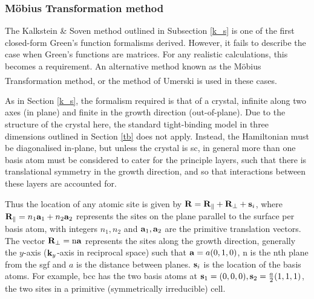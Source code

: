 \documentclass[a4paper, 12pt]{article}
\begin{document}
	\subsubsection{M\"{o}bius Transformation method}
	The Kalkstein \& Soven method outlined in Subsection \ref{k_s} is one of the first closed-form Green's function formalisms derived. However, it fails to describe the case when Green's functions are matrices. For any realistic calculations, this becomes a requirement. 
An alternative method known as the M\"{o}bius Transformation method, or the method of Umerski\textcolor{blue}{\textsuperscript{\cite{AU_SGF}}} is used in these cases.
\\\par As in Section \ref{k_s}, the formalism required is that of a crystal, infinite along two axes (in plane) and finite in the growth direction (out-of-plane). Due to the structure of the crystal here, the standard tight-binding model in three dimensions outlined in Section \ref{tb} does not apply.
Instead, the Hamiltonian must be diagonalised in-plane, but unless the crystal is \gls{sc}, in general more than one basis atom must be considered to cater for the principle layers, such that there is translational symmetry in the growth direction, and so that interactions between these layers are accounted for.
\\\par Thus the location of any atomic site is given by ${\bf R} = {\bf R}_\parallel + {\bf R}_\perp +{\bf s}_i$, where ${\bf R}_\parallel = n_1{\bf a}_1+n_2{\bf a}_2$ represents the sites on the plane parallel to the surface per basis atom, with integers $n_1,n_2$ and ${\bf a}_1,{\bf a}_2$ are the primitive translation vectors. The vector ${\bf R}_\perp = \rm n\bf a$ represents the sites along the growth direction, generally the $y$-axis (${\bf k}_y$-axis in reciprocal space) such that ${\bf a} = a(0,1,0)$, n is the nth plane from the \gls{sgf} and $a$ is the distance between planes.
${\bf s}_i$ is the location of the basis atoms. For example, \gls{bcc} has the two basis atoms at ${\bf s}_1 = (0,0,0), 	{\bf s}_2 = \frac{a}{2}(1,1,1)$, the two sites in a primitive (symmetrically irreducible) cell.
	\tikzset{external/export next=false}
\end{document}
